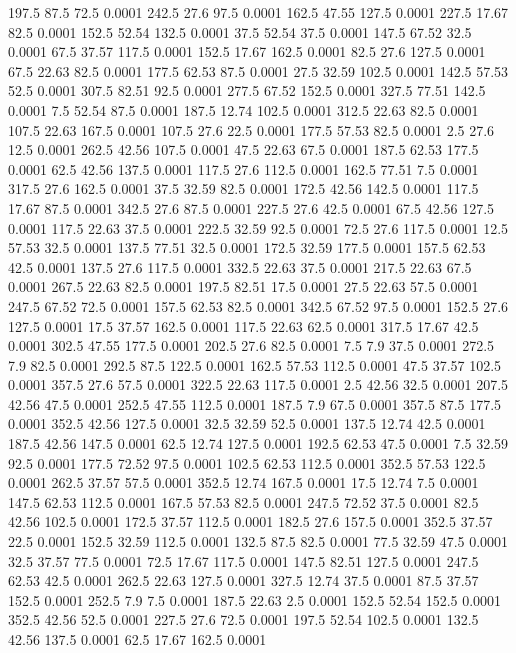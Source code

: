 197.5	87.5	72.5	0.0001
242.5	27.6	97.5	0.0001
162.5	47.55	127.5	0.0001
227.5	17.67	82.5	0.0001
152.5	52.54	132.5	0.0001
37.5	52.54	37.5	0.0001
147.5	67.52	32.5	0.0001
67.5	37.57	117.5	0.0001
152.5	17.67	162.5	0.0001
82.5	27.6	127.5	0.0001
67.5	22.63	82.5	0.0001
177.5	62.53	87.5	0.0001
27.5	32.59	102.5	0.0001
142.5	57.53	52.5	0.0001
307.5	82.51	92.5	0.0001
277.5	67.52	152.5	0.0001
327.5	77.51	142.5	0.0001
7.5	52.54	87.5	0.0001
187.5	12.74	102.5	0.0001
312.5	22.63	82.5	0.0001
107.5	22.63	167.5	0.0001
107.5	27.6	22.5	0.0001
177.5	57.53	82.5	0.0001
2.5	27.6	12.5	0.0001
262.5	42.56	107.5	0.0001
47.5	22.63	67.5	0.0001
187.5	62.53	177.5	0.0001
62.5	42.56	137.5	0.0001
117.5	27.6	112.5	0.0001
162.5	77.51	7.5	0.0001
317.5	27.6	162.5	0.0001
37.5	32.59	82.5	0.0001
172.5	42.56	142.5	0.0001
117.5	17.67	87.5	0.0001
342.5	27.6	87.5	0.0001
227.5	27.6	42.5	0.0001
67.5	42.56	127.5	0.0001
117.5	22.63	37.5	0.0001
222.5	32.59	92.5	0.0001
72.5	27.6	117.5	0.0001
12.5	57.53	32.5	0.0001
137.5	77.51	32.5	0.0001
172.5	32.59	177.5	0.0001
157.5	62.53	42.5	0.0001
137.5	27.6	117.5	0.0001
332.5	22.63	37.5	0.0001
217.5	22.63	67.5	0.0001
267.5	22.63	82.5	0.0001
197.5	82.51	17.5	0.0001
27.5	22.63	57.5	0.0001
247.5	67.52	72.5	0.0001
157.5	62.53	82.5	0.0001
342.5	67.52	97.5	0.0001
152.5	27.6	127.5	0.0001
17.5	37.57	162.5	0.0001
117.5	22.63	62.5	0.0001
317.5	17.67	42.5	0.0001
302.5	47.55	177.5	0.0001
202.5	27.6	82.5	0.0001
7.5	7.9	37.5	0.0001
272.5	7.9	82.5	0.0001
292.5	87.5	122.5	0.0001
162.5	57.53	112.5	0.0001
47.5	37.57	102.5	0.0001
357.5	27.6	57.5	0.0001
322.5	22.63	117.5	0.0001
2.5	42.56	32.5	0.0001
207.5	42.56	47.5	0.0001
252.5	47.55	112.5	0.0001
187.5	7.9	67.5	0.0001
357.5	87.5	177.5	0.0001
352.5	42.56	127.5	0.0001
32.5	32.59	52.5	0.0001
137.5	12.74	42.5	0.0001
187.5	42.56	147.5	0.0001
62.5	12.74	127.5	0.0001
192.5	62.53	47.5	0.0001
7.5	32.59	92.5	0.0001
177.5	72.52	97.5	0.0001
102.5	62.53	112.5	0.0001
352.5	57.53	122.5	0.0001
262.5	37.57	57.5	0.0001
352.5	12.74	167.5	0.0001
17.5	12.74	7.5	0.0001
147.5	62.53	112.5	0.0001
167.5	57.53	82.5	0.0001
247.5	72.52	37.5	0.0001
82.5	42.56	102.5	0.0001
172.5	37.57	112.5	0.0001
182.5	27.6	157.5	0.0001
352.5	37.57	22.5	0.0001
152.5	32.59	112.5	0.0001
132.5	87.5	82.5	0.0001
77.5	32.59	47.5	0.0001
32.5	37.57	77.5	0.0001
72.5	17.67	117.5	0.0001
147.5	82.51	127.5	0.0001
247.5	62.53	42.5	0.0001
262.5	22.63	127.5	0.0001
327.5	12.74	37.5	0.0001
87.5	37.57	152.5	0.0001
252.5	7.9	7.5	0.0001
187.5	22.63	2.5	0.0001
152.5	52.54	152.5	0.0001
352.5	42.56	52.5	0.0001
227.5	27.6	72.5	0.0001
197.5	52.54	102.5	0.0001
132.5	42.56	137.5	0.0001
62.5	17.67	162.5	0.0001

